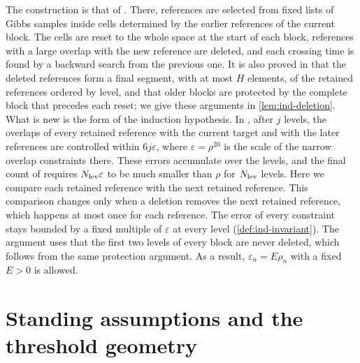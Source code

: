 The construction is that of \cite[Sections~8.3 and~8.4]{oai-barriers}. There, references are selected from fixed lists of Gibbs samples inside cells determined by the earlier references of the current block. The cells are reset to the whole space at the start of each block, references with a large overlap with the new reference are deleted, and each crossing time is found by a backward search from the previous one. It is also proved in \cite[Section~8.4]{oai-barriers} that the deleted references form a final segment, with at most $H$ elements, of the retained references ordered by level, and that older blocks are protected by the complete block that precedes each reset; we give these arguments in \cref{lem:ind-deletion}. What is new is the form of the induction hypothesis. In \cite[(8.19)--(8.20)]{oai-barriers}, after $j$ levels, the overlaps of every retained reference with the current target and with the later references are controlled within $6j\varepsilon$, where $\varepsilon=\rho^{20}$ is the scale of the narrow overlap constraints there. These errors accumulate over the levels, and the final count of \cite[(8.29)]{oai-barriers} requires $N_{\rm lev}\varepsilon$ to be much smaller than $\rho$ for $N_{\rm lev}$ levels. Here we compare each retained reference with the next retained reference. This comparison changes only when a deletion removes the next retained reference, which happens at most once for each reference. The error of every constraint stays bounded by a fixed multiple of $\varepsilon$ at every level (\cref{def:ind-invariant}). The argument uses that the first two levels of every block are never deleted, which follows from the same protection argument. As a result, $\varepsilon_n=E\rho_n$ with a fixed $E>0$ is allowed.

\section{Standing assumptions and the threshold geometry}\label{sec:ind-setting}

